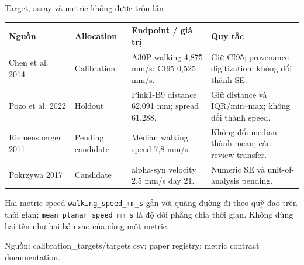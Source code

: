 \documentclass[10pt,aspectratio=169]{beamer}
\newcommand{\source}[1]{\par\vfill{\fontsize{6.0}{7}\selectfont\color{gray}Nguồn: #1\par}}
\newcommand{\smallgap}{\vspace{0.18cm}}
\begin{document}
\begin{frame}{Target, assay và metric không được trộn lẫn}
\renewcommand{\arraystretch}{1.22}\scriptsize
\begin{tabular}{@{}L{3.2cm}L{2.4cm}L{4.4cm}L{4.3cm}@{}}
\toprule
\textbf{Nguồn} & \textbf{Allocation} & \textbf{Endpoint / giá trị} & \textbf{Quy tắc}\\\midrule
Chen et al. 2014 & Calibration & A30P walking 4,875 mm/s; CI95 0,525 mm/s. & Giữ CI95; provenance digitization; không đổi thành SE.\\
Pozo et al. 2022 & Holdout & Pink1-B9 distance 62,091 mm; spread 61,288. & Giữ distance và IQR/min--max; không đổi thành speed.\\
Riemensperger 2011 & Pending candidate & Median walking speed 7,8 mm/s. & Không đổi median thành mean; cần review transfer.\\
Pokrzywa 2017 & Candidate & alpha-syn velocity 2,5 mm/s day 21. & Numeric SE và unit-of-analysis pending.\\\bottomrule
\end{tabular}
\smallgap
\begin{block}{Hai metric speed}
\texttt{walking\_speed\_mm\_s} gần với quãng đường đi theo quỹ đạo trên thời gian; \texttt{mean\_planar\_speed\_mm\_s} là độ dời phẳng chia thời gian. Không dùng hai tên như hai bản sao của cùng một metric.
\end{block}
\source{calibration\_targets/targets.csv; paper registry; metric contract documentation.}
\end{frame}
\end{document}
